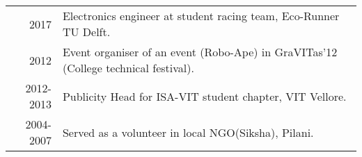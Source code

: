 %
%





\begin{tabular}{rl}	
	2017 & Electronics engineer at student racing team, Eco-Runner TU Delft.\\
	2012 & Event organiser of an event (Robo-Ape) in GraVITas'12 (College technical festival). \\
	2012-2013 & Publicity Head for ISA-VIT student chapter, VIT Vellore. \\
	2004-2007 & Served as a volunteer in local NGO(Siksha), Pilani.\\
\end{tabular}